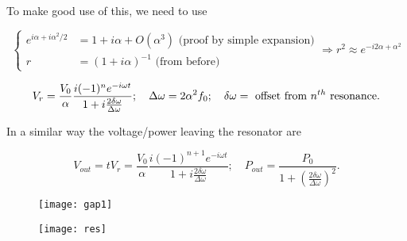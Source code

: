  \noindent To make good use of this, we need to use

 \begin{equation}\label{tlineApprox}
   \left\lbrace
     \begin{aligned}
       e^{i\alpha+i\alpha^2/2} & = 1+i\alpha +O(\alpha^3) \text{ (proof by simple expansion)}\\
       r & = (1+i\alpha)^{-1} \text{ (from before)}
     \end{aligned}\right.\Rightarrow r^2 \approx e^{-i2\alpha +\alpha^2}
 \end{equation}

 \noindent {}

 \begin{equation}\label{tlineVoltage}
   V_r = \frac{V_0}{\alpha}\frac{i(-1)^{n}e^{-i\omega t}}{1+i\frac{2\delta\omega}{\Delta\omega}};\quad \Delta\omega = 2\alpha^2f_0;\quad \delta\omega = \text{ offset from $ n^{th} $ resonance}.
 \end{equation}

 \noindent  {}
 In a similar way the voltage/power leaving the resonator are

 \begin{equation}\label{tlineLeaving}
   V_{out} = tV_r = \frac{V_0}{\alpha}\frac{i(-1)^{n+1}e^{-i\omega t}}{1+i\frac{2\delta\omega}{\Delta\omega}}; \quad P_{out} = \frac{P_0}{1+\left(\frac{2\delta\omega}{\Delta\omega}\right)^2}.
 \end{equation}

  \begin{figure}[h]
    \centering%
    \texttt{[image: gap1]}
  \end{figure}




   \begin{figure}[h]
     \centering%
     \texttt{[image: res]}
   \end{figure}

